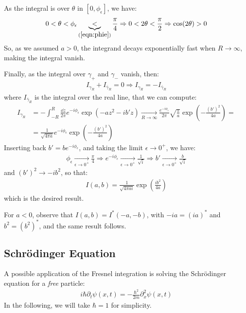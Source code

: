 \documentclass[../template.tex]{subfiles}
\begin{document}
As the integral is over $\theta$ in $[0,\phi_\epsilon]$, we have:
\begin{align*}
    0 < \theta < \phi_\epsilon \underbrace{<}_{(\ref{eqn:phie})}  \frac{\pi}{4} \Rightarrow 0 < 2 \theta < \frac{\pi}{2} \Rightarrow \cos(2 \theta) > 0  
\end{align*}
So, as we assumed $a > 0$, the integrand decays exponentially fast when $R \to \infty$, making the integral vanish.

\medskip

Finally, as the integral over $\gamma_+$ and $\gamma_-$ vanish, then:
\begin{align*}
    I_{\gamma_R} + I_{\bar{\gamma}_{R}} = 0 \Rightarrow I_{{\gamma}_{R}} = -I_{\bar{\gamma}_{R}}
\end{align*}
where $I_{\bar{\gamma}_R}$ is the integral over the real line, that we can compute:
\begin{align*}
    I_{\gamma_R} &= -\int_{-R}^R \frac{\dd{z}}{2 \pi} e^{-i \phi_\epsilon} \exp(-a z^2 - i b' z)  \xrightarrow[R \to \infty]{}    \frac{e^{-i \phi_\epsilon}}{2 \pi} \sqrt{\frac{\pi}{a} }  \exp\left(-\frac{(b')^2}{4a} \right) =\\
    &= \frac{1}{\sqrt{4 \pi a}} e^{-i \phi_\epsilon} \exp\left(-\frac{(b')^2}{4a} \right)
\end{align*}
Inserting back $b' = b e^{-i\phi_\epsilon}$, and taking the limit $\epsilon \to 0^+$, we have:
\begin{align*}
    \phi_\epsilon  \xrightarrow[\epsilon \to 0^+]{}   \frac{\pi}{4} \Rightarrow e^{-i\phi_\epsilon} \xrightarrow[\epsilon \to 0^+]{}  \frac{1}{\sqrt{i}}  \Rightarrow b' \xrightarrow[\epsilon \to 0^+]{}   \frac{b}{\sqrt{i}} 
\end{align*} 
and $(b')^2 \to -ib^2$, so that:
\begin{align*}
    I(a,b) = \frac{1}{\sqrt{4 \pi a i}}  \exp\left(\frac{ib^2}{4a} \right)
\end{align*}
which is the desired result.

\medskip

For $a < 0$, observe that $I(a,b) = I^*(-a,-b)$, with $-ia = (ia)^*$ and $b^2 = (b^2)^*$, and the same result follows.

\subsection{Schr\"odinger Equation}
A possible application of the Fresnel integration is solving the Schr\"odinger equation for a \textit{free} particle:
\begin{align*}
    i \hbar \partial_t \psi(x,t) = -\frac{\hbar^2}{2m} \partial_x^2 \psi(x,t)   
\end{align*} 
In the following, we will take $\hbar = 1$ for simplicity. %
\end{document}
